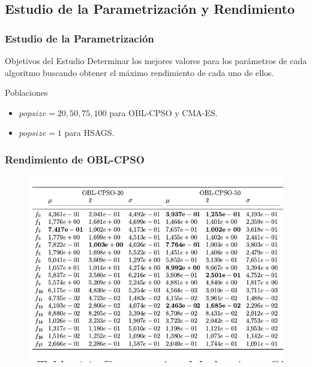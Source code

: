 \subsection{Estudio de la Parametrización y Rendimiento}

\begin{frame}
\frametitle{Estudio de la Parametrización}
\begin{block}{Objetivos del Estudio}
Determinar los mejores valores para los parámetros de cada algoritmo buscando obtener el máximo rendimiento de cada uno de ellos.
\end{block}
\begin{block}{Poblaciones}
\begin{itemize}
	\item $popsize = 20, 50, 75, 100$ para OBL-CPSO y CMA-ES.
	\item $popsize = 1$ para HSAGS.
	\end{itemize}
\end{block}
\end{frame}

\begin{frame}
\frametitle{Rendimiento de OBL-CPSO}
\begin{figure}
  \centering
	\includegraphics[scale=0.5]{img/oblcpso1}
\end{figure}
\end{frame}

